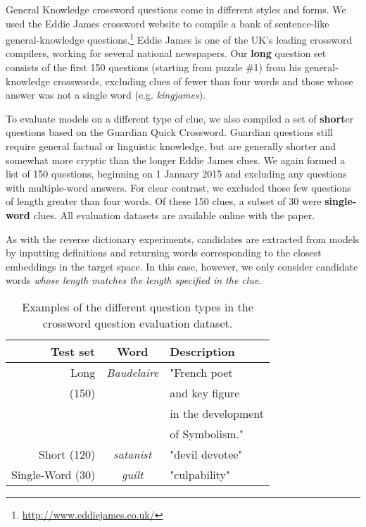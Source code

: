 General Knowledge crossword questions come in different styles and forms. We used the Eddie James crossword website to compile a bank of sentence-like general-knowledge questions.\footnote{\url{http://www.eddiejames.co.uk/}} Eddie James is one of the UK's leading crossword compilers, working for several national newspapers. Our { \bf long} question set consists of the first 150 questions (starting from puzzle \#1) from his general-knowledge crosswords, excluding clues of fewer than four words and those whose answer was not a single word (e.g. \emph{kingjames}).

To evaluate models on a different type of clue, we also compiled a set of {\bf short}er questions based on the Guardian Quick Crossword. Guardian questions still require general factual or linguistic knowledge, but are generally shorter and somewhat more cryptic than the longer Eddie James clues. We again formed a list of 150 questions, beginning on 1 January 2015 and excluding any questions with multiple-word answers. For clear contrast, we excluded those few questions of length greater than four words. Of these 150 clues, a subset of 30 were {\bf single-word} clues. All evaluation datasets are available online with the paper. 

As with the reverse dictionary experiments, candidates are extracted from models by inputting definitions and returning words corresponding to the closest embeddings in the target space. In this case, however, we only consider candidate words \emph{whose length matches the length specified in the clue}.

\begin{table}[ht]
{\small
\emph
\hfill{}
\begin{tabular}{r|cl}
\bf Test set & \bf Word & \bf Description \\
\hline

\hdashline
Long &   \emph{Baudelaire} & "French poet \\ 
 (150) & & and key figure \\ 
&& in the development \\ 
&& of Symbolism." \\
\hdashline 
\rule{0pt}{3ex} 

Short (120) &   \emph{satanist} & "devil devotee" \\

\hdashline
\rule{0pt}{3ex} 
Single-Word (30) &   \emph{guilt} & "culpability" \\
\end{tabular}
\caption{Examples of the different question types in the crossword question evaluation dataset.}
\label{tb:tablename}}
\end{table}

